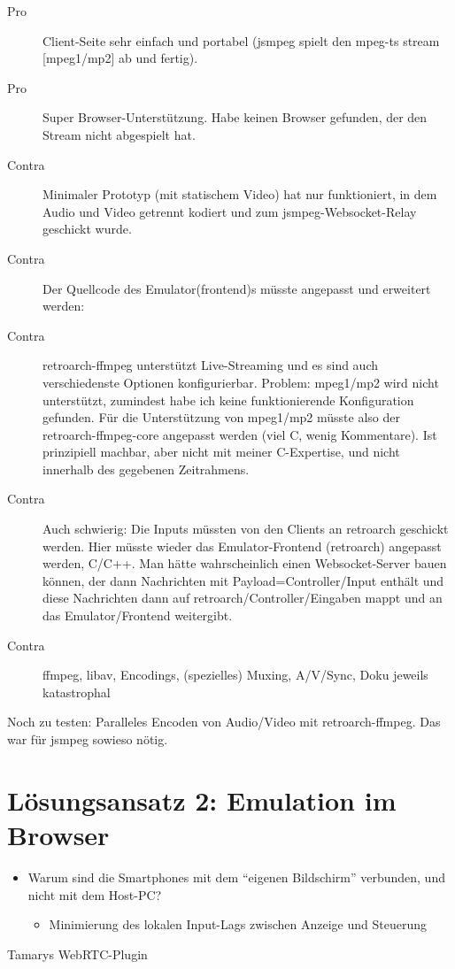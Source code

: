 \begin{description}
    \item [Pro] Client-Seite sehr einfach und portabel (jsmpeg spielt den mpeg-ts stream [mpeg1/mp2] ab und fertig).
    \item [Pro] Super Browser-Unterstützung. Habe keinen Browser gefunden, der den Stream nicht abgespielt hat.
    \item [Contra]  Minimaler Prototyp (mit statischem Video) hat nur funktioniert, in dem Audio und Video getrennt kodiert und zum jsmpeg-Websocket-Relay geschickt wurde.
\item [Contra] Der Quellcode des Emulator(frontend)s müsste angepasst und erweitert werden:
    \item [Contra] retroarch-ffmpeg unterstützt Live-Streaming und es sind auch verschiedenste Optionen konfigurierbar. Problem: mpeg1/mp2 wird nicht unterstützt, zumindest habe ich keine funktionierende Konfiguration gefunden. Für die Unterstützung von mpeg1/mp2 müsste also der retroarch-ffmpeg-core angepasst werden (viel C, wenig Kommentare). Ist prinzipiell machbar, aber nicht mit meiner C-Expertise, und nicht innerhalb des gegebenen Zeitrahmens.
    \item [Contra] Auch schwierig: Die Inputs müssten von den Clients an retroarch geschickt werden. Hier müsste wieder das Emulator-Frontend (retroarch) angepasst werden, C/C++. Man hätte wahrscheinlich einen Websocket-Server bauen können, der dann Nachrichten mit Payload=Controller\-/Input enthält und diese Nachrichten dann auf retroarch\-/Controller\-/Eingaben mappt und an das Emulator\-/Frontend weitergibt.
    \item [Contra] ffmpeg, libav, Encodings, (spezielles) Muxing, \mbox{A/V\-/Sync}, Doku jeweils katastrophal
\end{description}

Noch zu testen: Paralleles Encoden von Audio/Video mit retroarch-ffmpeg.
Das war für jsmpeg sowieso nötig.

\section{Lösungsansatz 2: Emulation im
Browser}\label{luxf6sungsansatz-2-emulation-im-browser}

\begin{itemize}
\tightlist
\item
  Warum sind die Smartphones mit dem ``eigenen Bildschirm'' verbunden,
  und nicht mit dem Host-PC?

  \begin{itemize}
  \tightlist
  \item
    Minimierung des lokalen Input-Lags zwischen Anzeige und Steuerung
  \end{itemize}
\end{itemize}

Tamarys WebRTC-Plugin
